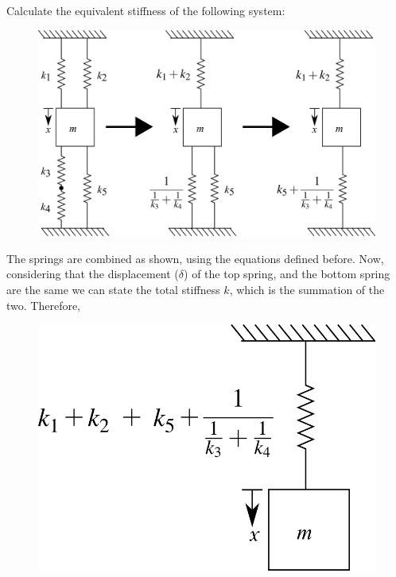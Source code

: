 \documentclass[12pt,letter]{article}
\begin{document}
			\begin{example}

				Calculate the equivalent stiffness of the following system:
				\begin{figure}[H]
					\centering
					\includegraphics[]{../figures/equivalent_mass_and_spring_system_1.png}
				\end{figure}	
				The springs are combined as shown, using the equations defined before.  Now, considering that the displacement ($\delta$) of the top spring, and the bottom spring are the same we can state the total stiffness $k$, which is the summation of the two. Therefore,    
				\begin{figure}[H]
					\centering
					\includegraphics[]{../figures/equivalent_mass_and_spring_system_2.png}
				\end{figure}	

\end{example}
\end{document}
